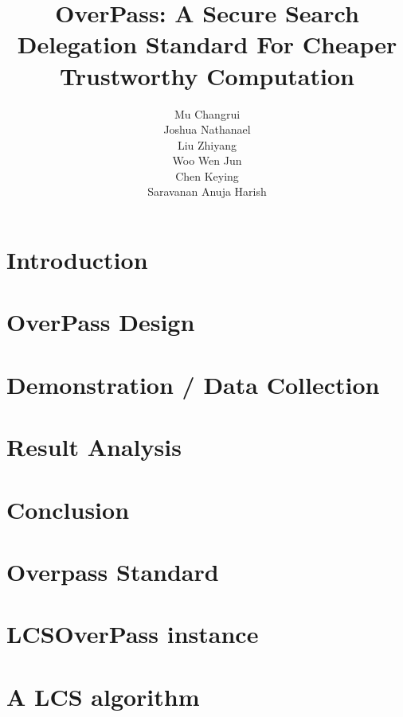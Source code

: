 \documentclass[9pt,oneside]{amsart}
\title[OverPass: A Secure Search Delegation Standard For Cheaper Trustworthy Computation]{OverPass: A Secure Search Delegation Standard For Cheaper Trustworthy Computation}
\author{
    Mu Changrui\\
    Joshua Nathanael\\
    Liu Zhiyang\\
    Woo Wen Jun\\
    Chen Keying\\
    Saravanan Anuja Harish
}
\begin{document}
\pagecolor{pagecolor}



\maketitle

\setlength{\columnsep}{20pt}
\begin{multicols}{2}

\section{Introduction}\label{sec:introduction}


\section{OverPass Design}


\section{Demonstration / Data Collection}

\section{Result Analysis}

\section{Conclusion}

\newpage
\pagestyle{plain}
\printbibliography
\end{multicols}
\newpage
\appendix
\section{Overpass Standard}

\newpage
\section{LCSOverPass instance}

\newpage
\section{A LCS algorithm}

\end{document}
